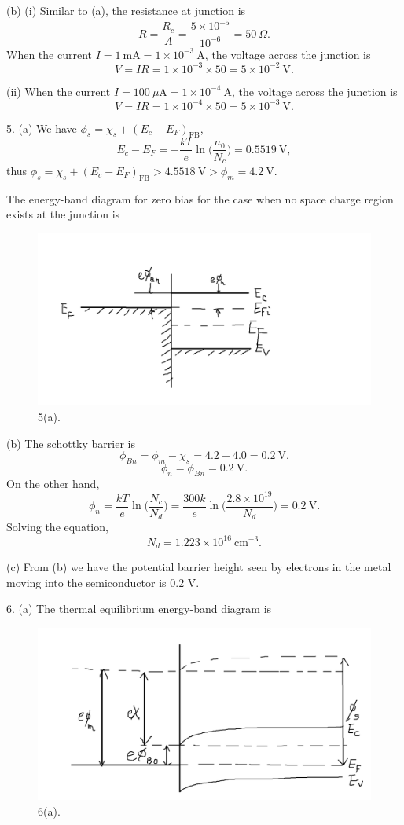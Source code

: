 \documentclass[a4paper]{article}
\begin{document}
(b) (i) Similar to (a), the resistance at junction is
$$R=\frac{R_c}{A}=\frac{5\times10^{-5}}{10^{-6}}=50\ \Omega.$$
When the current $I=1\ \mathrm{mA}=1\times10^{-3}\ \mathrm{A}$, the voltage across the junction is
$$V=IR=1\times10^{-3}\times50=5\times10^{-2}\ \mathrm{V}.$$

(ii) When the current $I=100\ \mu\mathrm{A}=1\times10^{-4}\ \mathrm{A}$, the voltage across the junction is
$$V=IR=1\times10^{-4}\times50=5\times10^{-3}\ \mathrm{V}.$$

5. (a) We have $\phi_s=\chi_s+(E_c-E_F)_\text{FB}$,
$$E_c-E_F=-\frac{kT}{e}\ln{\bigg(\frac{n_0}{N_c}\bigg)}=0.5519\ \mathrm{V},$$
thus $\phi_s=\chi_s+(E_c-E_F)_\text{FB}>4.5518\ \mathrm{V}>\phi_m=4.2\ \mathrm{V}$.

The energy-band diagram for zero bias for the case when no space charge region exists at the junction is
\begin{figure}[H]
    \centering
    \includegraphics[width=1\textwidth]{1.png}
    \caption{5(a).}
\end{figure}
(b) The schottky barrier is
$$\phi_{Bn}=\phi_m-\chi_s=4.2-4.0=0.2\ \mathrm{V}.$$
$$\phi_n=\phi_{Bn}=0.2\ \mathrm{V}.$$
On the other hand,
$$\phi_n=\frac{kT}{e}\ln{\bigg(\frac{N_c}{N_d}\bigg)}=\frac{300k}{e}\ln{\bigg(\frac{2.8\times10^{19}}{N_d}\bigg)}=0.2\ \mathrm{V}.$$
Solving the equation,
$$N_d=1.223\times10^{16}\ \mathrm{cm^{-3}}.$$

(c) From (b) we have the potential barrier height seen by electrons in the metal moving into the semiconductor is 0.2 V.

6. (a) The thermal equilibrium energy-band diagram is
\begin{figure}[H]
    \centering
    \includegraphics[width=1\textwidth]{2.png}
    \caption{6(a).}
\end{figure}
\end{document}
